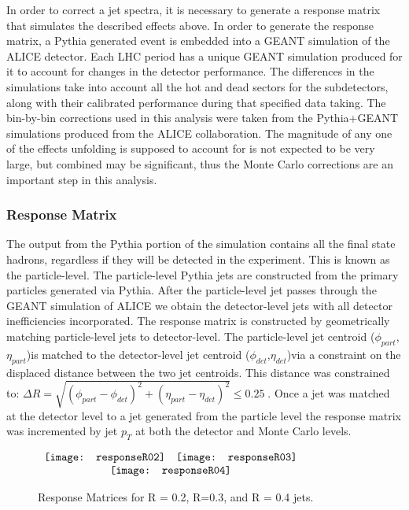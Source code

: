 In order to correct a jet spectra, it is necessary to generate a response matrix that simulates the described effects above.  In order to generate the response matrix, a Pythia generated event is embedded into a GEANT simulation of the ALICE detector.  Each LHC period has a unique GEANT simulation produced for it to account for changes in the detector performance.  The differences in the simulations take into account all the hot and dead sectors for the subdetectors, along with their calibrated performance during that specified data taking.  The bin-by-bin corrections used in this analysis were taken from the Pythia+GEANT simulations produced from the ALICE collaboration.  The magnitude of any one of the effects unfolding is supposed to account for is not expected to be very large, but combined may be significant, thus the Monte Carlo corrections are an important step in this analysis.

\subsubsection{Response Matrix}
The output from the Pythia portion of the simulation contains all the final state hadrons, regardless if they will be detected in the experiment.  This is known as the particle-level.  The particle-level Pythia jets are constructed from the primary particles generated via Pythia.  After the particle-level jet passes through the GEANT simulation of ALICE we obtain the detector-level jets with all detector inefficiencies incorporated.
The response matrix is constructed by geometrically matching particle-level jets to detector-level.  The particle-level jet centroid ($\phi_{part}$,$\eta_{part}$)is matched to the detector-level jet centroid ($\phi_{det}$,$\eta_{det}$)via a constraint on the displaced distance between the two jet centroids.  This distance was constrained to: $\Delta  R = \sqrt{(\phi_{part} - \phi_{det})^{2} + (\eta_{part} - \eta_{det})^{2}} \leq 0.25 \; $.  Once a jet was matched at the detector level to a jet generated from the particle level the response matrix was incremented by jet $p_{T}$ at both the detector and Monte Carlo levels.

\begin{figure*}[t!]
$\begin{array}{rl}
    \texttt{[image: responseR02]} &
    \texttt{[image: responseR03]}\\
    \multicolumn{2}{c}{\texttt{[image: responseR04]}}
\end{array}$
\caption[Response Matrices for R = 0.2 (top left), R=0.3 (top right), and R = 0.4 (bottom) jets.]{\label{fig:response}Response Matrices for R = 0.2, R=0.3, and R = 0.4 jets.}
\end{figure*}

